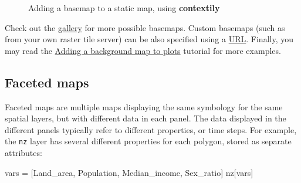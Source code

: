 \documentclass[
  letterpaper,
]{krantz}
\newenvironment{Shaded}{\begin{snugshade}}{\end{snugshade}}
\newcommand{\BuiltInTok}[1]{\textcolor[rgb]{0.00,0.23,0.31}{#1}}
\newcommand{\NormalTok}[1]{\textcolor[rgb]{0.00,0.23,0.31}{#1}}
\newcommand{\OperatorTok}[1]{\textcolor[rgb]{0.37,0.37,0.37}{#1}}
\newcommand{\StringTok}[1]{\textcolor[rgb]{0.13,0.47,0.30}{#1}}
\begin{document}
\begin{figure}

\begin{minipage}{0.50\linewidth}



\end{minipage}%
%
\begin{minipage}{0.50\linewidth}



\end{minipage}%

\caption{\label{fig-basemap}Adding a basemap to a static map, using
\textbf{contextily}}

\end{figure}%

Check out the
\href{https://xyzservices.readthedocs.io/en/stable/gallery.html}{gallery}
for more possible basemaps. Custom basemaps (such as from your own
raster tile server) can be also specified using a
\href{https://contextily.readthedocs.io/en/latest/providers_deepdive.html\#Manually-specifying-a-provider}{URL}.
Finally, you may read the
\href{https://geopandas.org/en/stable/gallery/plotting_basemap_background.html}{Adding
a background map to plots} tutorial for more examples.

\subsection{Faceted maps}\label{sec-faceted-maps}

Faceted maps are multiple maps displaying the same symbology for the
same spatial layers, but with different data in each panel. The data
displayed in the different panels typically refer to different
properties, or time steps. For example, the \texttt{nz} layer has
several different properties for each polygon, stored as separate
attributes:

\begin{Shaded}
\begin{Highlighting}[]
\BuiltInTok{vars} \OperatorTok{=}\NormalTok{ [}\StringTok{\textquotesingle{}Land\_area\textquotesingle{}}\NormalTok{, }\StringTok{\textquotesingle{}Population\textquotesingle{}}\NormalTok{, }\StringTok{\textquotesingle{}Median\_income\textquotesingle{}}\NormalTok{, }\StringTok{\textquotesingle{}Sex\_ratio\textquotesingle{}}\NormalTok{]}
\NormalTok{nz[}\BuiltInTok{vars}\NormalTok{]}
\end{Highlighting}
\end{Shaded}
\end{document}

